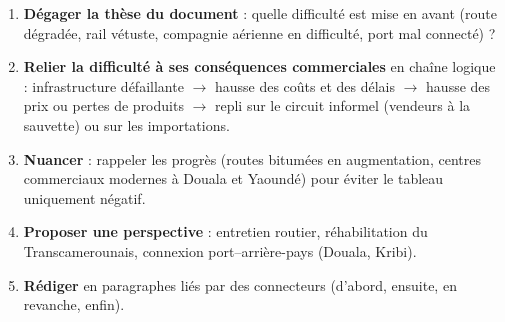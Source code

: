 \documentclass[11pt]{article}
\begin{document}
\begin{methode}
\begin{enumerate}
\item \textbf{Dégager la thèse du document} : quelle difficulté est mise en avant (route dégradée, rail vétuste, compagnie aérienne en difficulté, port mal connecté) ?
\item \textbf{Relier la difficulté à ses conséquences commerciales} en chaîne logique : infrastructure défaillante $\rightarrow$ hausse des coûts et des délais $\rightarrow$ hausse des prix ou pertes de produits $\rightarrow$ repli sur le circuit informel (vendeurs à la sauvette) ou sur les importations.
\item \textbf{Nuancer} : rappeler les progrès (routes bitumées en augmentation, centres commerciaux modernes à Douala et Yaoundé) pour éviter le tableau uniquement négatif.
\item \textbf{Proposer une perspective} : entretien routier, réhabilitation du Transcamerounais, connexion port--arrière-pays (Douala, Kribi).
\item \textbf{Rédiger} en paragraphes liés par des connecteurs (d'abord, ensuite, en revanche, enfin).
\end{enumerate}
\end{methode}
\end{document}
